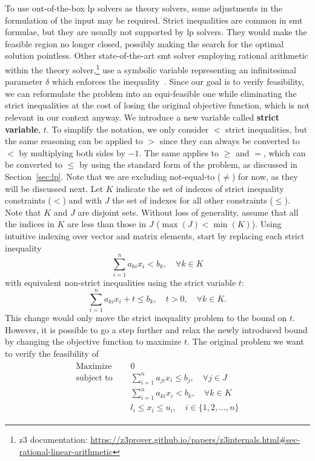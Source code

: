 \documentclass[runningheads]{llncs}
\begin{document}
To use out-of-the-box \gls{lp} solvers as theory solvers, some adjustments in the formulation of the input may be required.
Strict inequalities are common in \gls{smt} formulae, but they are usually not supported by \gls{lp} solvers.
They would make the feasible region no longer closed, possibly making the search for the optimal solution pointless.
Other state-of-the-art \gls{smt} solver employing rational arithmetic within the theory solver,\footnote{z3 documentation: \url{https://z3prover.github.io/papers/z3internals.html\#sec-rational-linear-arithmetic}} use a symbolic variable representing an infinitesimal parameter $\delta$ which enforces the inequality~\cite{ref:lra-dpll-t}.
Since our goal is to verify feasibility, we can reformulate the problem into an equi-feasible one while eliminating the strict inequalities at the cost of losing the original objective function, which is not relevant in our context anyway.
We introduce a new variable called \textbf{strict variable}, $t$.
To simplify the notation, we only consider $<$ strict inequalities, but the same reasoning can be applied to $>$ since they can always be converted to $<$ by multiplying both sides by $-1$.
The same applies to $\ge$ and $=$, which can be converted to $\le$ by using the standard form of the problem, as discussed in Section~\ref{sec:lp}.
Note that we are excluding not-equal-to ($\neq$) for now, as they will be discussed next.
Let $K$ indicate the set of indexes of strict inequality constraints ($<$) and with $J$ the set of indexes for all other constraints ($\le$).
Note that $K$ and $J$ are disjoint sets.
Without loss of generality, assume that all the indices in $K$ are less than those in $J$ ($\max(J) < \min(K)$).
Using intuitive indexing over vector and matrix elements, start by replacing each strict inequality
\begin{equation*}
    \sum_{i=1}^{n} a_{ki}x_{i} < b_k, \quad \forall k \in K
\end{equation*}
with equivalent non-strict inequalities using the strict variable $t$:
\begin{equation*}
    \sum_{i=1}^{n} a_{ki}x_{i} + t \le b_k, \quad t > 0, \quad \forall k \in K.
\end{equation*}
This change would only move the strict inequality problem to the bound on $t$.
However, it is possible to go a step further and relax the newly introduced bound by changing the objective function to maximize $t$.
The original problem we want to verify the feasibility of
\begin{align}
    \label{eq:lp-original}
    \begin{split}
        \text{Maximize }   \quad & 0                                                          \\
        \text{subject to } \quad & \sum_{i=1}^{n} a_{ji}x_{i} \le b_j,  \quad \forall j \in J \\
        \quad                    & \sum_{i=1}^{n} a_{ki}x_{i} < b_k,   \quad \forall k \in K  \\
        & l_i \le x_i \le u_i,  \quad i \in \{1, 2, \ldots, n\}
    \end{split}
\end{align}
\end{document}
